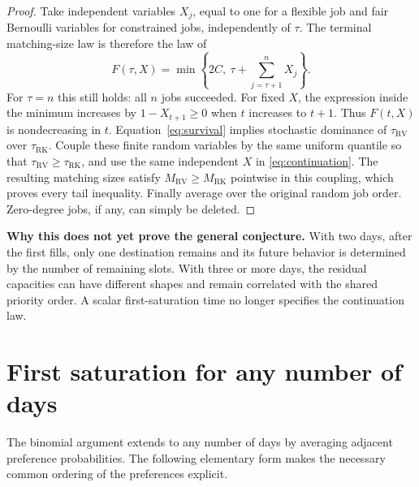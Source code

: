 \documentclass[11pt]{article}
\newcommand{\RV}{\mathrm{RV}}
\newcommand{\RK}{\mathrm{RK}}
\begin{document}
\begin{proof}
Take independent variables $X_j$, equal to one for a flexible job and
fair Bernoulli variables for constrained jobs, independently of $\tau$.
The terminal matching-size law is therefore the law of
\begin{equation}\label{eq:continuation}
 F(\tau,X)=\min\left\{2C,\ \tau+\sum_{j=\tau+1}^n X_j\right\}.
\end{equation}
For $\tau=n$ this still holds: all $n$ jobs succeeded. For fixed $X$,
the expression inside the minimum increases by $1-X_{t+1}\geq0$
when $t$ increases to $t+1$. Thus $F(t,X)$ is nondecreasing in $t$.
Equation~\eqref{eq:survival} implies stochastic dominance of
$\tau_\RV$ over $\tau_\RK$. Couple these finite random variables by
the same uniform quantile so that $\tau_\RV\geq\tau_\RK$, and use
the same independent $X$ in \eqref{eq:continuation}. The resulting
matching sizes satisfy $M_\RV\geq M_\RK$ pointwise in this coupling,
which proves every tail inequality. Finally average over the original
random job order. Zero-degree jobs, if any, can simply be deleted.
\end{proof}

\noindent\textbf{Why this does not yet prove the general conjecture.}
With two days, after the first fills, only one destination remains and
its future behavior is determined by the number of remaining slots.
With three or more days, the residual capacities can have different
shapes and remain correlated with the shared priority order. A scalar
first-saturation time no longer specifies the continuation law.

\section{First saturation for any number of days}
The binomial argument extends to any number of days by averaging adjacent
preference probabilities. The following elementary form makes the necessary
common ordering of the preferences explicit.
\end{document}
